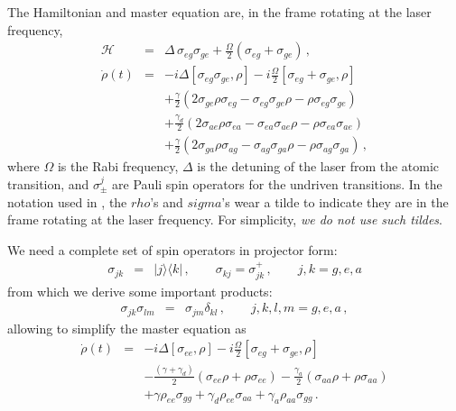 \documentclass[twocolumn,aps,eqsecnum,showkeys,amsmath]{revtex4-2}
\begin{document}
The Hamiltonian and master equation are, in the frame rotating at the laser 
frequency, 
%
\begin{eqnarray}
\mathcal{H} &=& \Delta \, \sigma_{eg} \sigma_{ge} 
	+\frac{\Omega}{2} ( \sigma_{eg} +\sigma_{ge}) 	 \,, 		\\
%
\dot{\rho}(t) &=& -i \Delta [\sigma_{eg} \sigma_{ge} ,\rho] 
	-i \frac{\Omega}{2} [\sigma_{eg} +\sigma_{ge} ,\rho]    \nonumber \\ 
&& +\frac{\gamma}{2} (2\sigma_{ge} \rho \sigma_{eg} 
  -\sigma_{eg} \sigma_{ge} \rho  -\rho \sigma_{eg} \sigma_{ge})     
  \nonumber \\
&& + \frac{\gamma_d}{2} (2\sigma_{ae} \rho \sigma_{ea} 
  -\sigma_{ea} \sigma_{ae} \rho -\rho \sigma_{ea} \sigma_{ae}) 	\nonumber \\ 
&& +\frac{\gamma}{2} (2\sigma_{ga} \rho \sigma_{ag} 
  -\sigma_{ag} \sigma_{ga} \rho  -\rho \sigma_{ag} \sigma_{ga}) \,, 
\end{eqnarray}
where $\Omega$ is the Rabi frequency, $\Delta$ is the detuning of the laser 
from the atomic transition, and $\sigma_{\pm}^j$ are Pauli spin operators for 
the undriven transitions. In the notation used in \cite{Carm99}, the $rho$'s 
and $sigma$'s wear a tilde to indicate they are in the frame rotating at the 
laser frequency. For simplicity, \textit{we do not use such tildes}. 

We need a complete set of spin operators in projector form: 
%
\begin{eqnarray*}
\sigma_{jk} &=& |j \rangle\langle k| \,, 
	\qquad \sigma_{kj} = \sigma_{jk}^+ \,, \qquad j,k=g,e,a   
\end{eqnarray*}
from which we derive some important products: 
%
\begin{eqnarray*}
\sigma_{jk} \sigma_{lm} &=& \sigma_{jm} \delta_{kl}  \,, 
\qquad  j,k,l,m =g,e,a 	\,, 
\end{eqnarray*}
allowing to simplify the master equation as 
%
\begin{eqnarray}
\dot{\rho}(t) &=& -i \Delta [\sigma_{ee} ,\rho] 
	-i \frac{\Omega}{2} [\sigma_{eg} +\sigma_{ge} ,\rho]    \nonumber \\ 
&& -	\frac{(\gamma +\gamma_d)}{2} (\sigma_{ee} \rho +\rho \sigma_{ee}) 
    -\frac{\gamma_a}{2} (\sigma_{aa} \rho +\rho \sigma_{aa}) 
        \nonumber \\
&& +\gamma \rho_{ee} \sigma_{gg}  +\gamma_d \rho_{ee} \sigma_{aa}    
    +\gamma_a \rho_{aa} \sigma_{gg}  \,.     \label{masterEqC}
\end{eqnarray}
\end{document}
